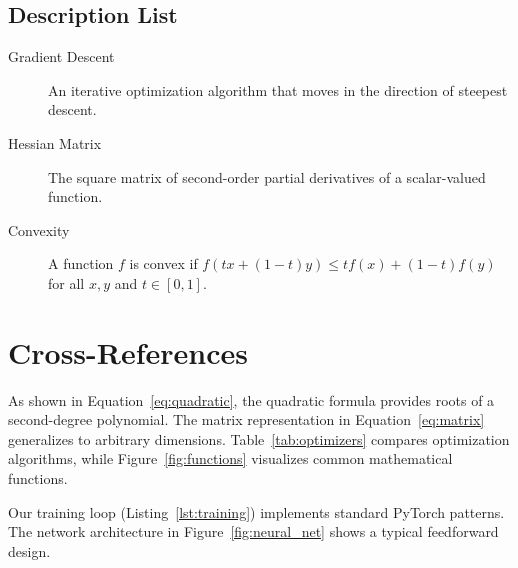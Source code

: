 \documentclass[11pt,a4paper]{article}
\begin{document}
\subsection{Description List}

\begin{description}
    \item[Gradient Descent] An iterative optimization algorithm that moves in the direction
    of steepest descent.
    \item[Hessian Matrix] The square matrix of second-order partial derivatives of a
    scalar-valued function.
    \item[Convexity] A function $f$ is convex if $f(tx + (1-t)y) \leq tf(x) + (1-t)f(y)$
    for all $x, y$ and $t \in [0,1]$.
\end{description}

\section{Cross-References}
As shown in Equation~\ref{eq:quadratic}, the quadratic formula provides roots of a
second-degree polynomial. The matrix representation in Equation~\ref{eq:matrix} generalizes
to arbitrary dimensions. Table~\ref{tab:optimizers} compares optimization algorithms, while
Figure~\ref{fig:functions} visualizes common mathematical functions.

Our training loop (Listing~\ref{lst:training}) implements standard PyTorch patterns.
The network architecture in Figure~\ref{fig:neural_net} shows a typical feedforward design.
\end{document}
